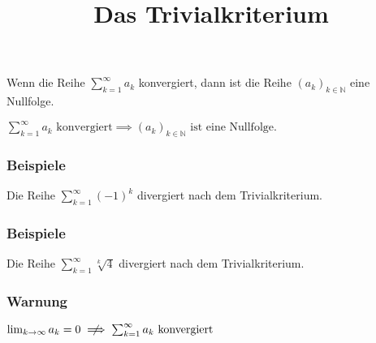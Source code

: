 \documentclass[aspectratio=169]{beamer}
\title{Das Trivialkriterium}
\date{}
\newcommand*{\N}{\mathbb N}
\begin{document}
  \begin{frame}
    \titlepage
  \end{frame}

  \begin{frame}
    \begin{theorem}[Trivialkriterium]
      Wenn die Reihe $\sum_{k=1}^\infty a_k$ konvergiert, dann ist die Reihe $(a_k)_{k\in\N}$ eine Nullfolge.
    \end{theorem}
  \end{frame}

  \begin{frame}
    $\sum_{k=1}^\infty a_k \text{ konvergiert} \implies (a_k)_{k\in\N} \text{ ist eine Nullfolge.}$
  \end{frame}

  \begin{frame}
    \frametitle{Beispiele}

    Die Reihe $\sum_{k=1}^\infty (-1)^k$ divergiert nach dem Trivialkriterium.
  \end{frame}

  \begin{frame}
    \frametitle{Beispiele}

    Die Reihe $\sum_{k=1}^\infty \sqrt[k]{4}$ divergiert nach dem Trivialkriterium.
  \end{frame}

  \begin{frame}
    \frametitle{Warnung}

    $\lim_{k\to\infty} a_k = 0 \centernot\implies \sum_{k=1}^\infty a_k \text{ konvergiert}$
  \end{frame}
\end{document}
